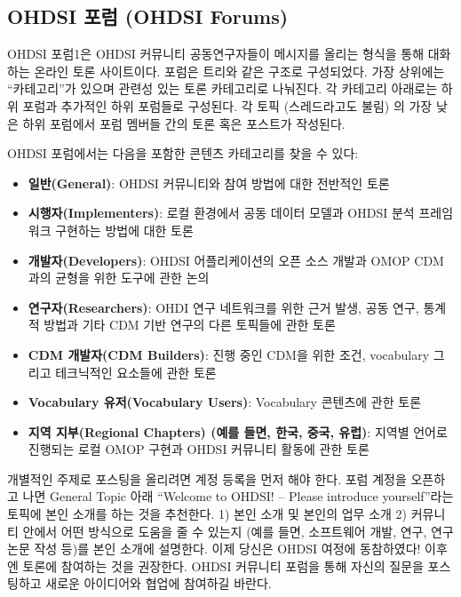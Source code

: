 \documentclass[11pt]{book}
\providecommand{\tightlist}{%
  \setlength{\itemsep}{0pt}\setlength{\parskip}{0pt}}
\theoremstyle{definition}
\theoremstyle{definition}
\theoremstyle{definition}
\theoremstyle{remark}
\begin{document}
\subsection{OHDSI 포럼 (OHDSI Forums)}\label{ohdsi--ohdsi-forums}

OHDSI 포럼1은 OHDSI 커뮤니티 공동연구자들이 메시지를 올리는 형식을 통해
대화하는 온라인 토론 사이트이다. 포럼은 트리와 같은 구조로 구성되었다.
가장 상위에는 ``카테고리''가 있으며 관련성 있는 토론 카테고리로
나눠진다. 각 카테고리 아래로는 하위 포럼과 추가적인 하위 포럼들로
구성된다. 각 토픽 (스레드라고도 불림) 의 가장 낮은 하위 포럼에서 포럼
멤버들 간의 토론 혹은 포스트가 작성된다.

OHDSI 포럼에서는 다음을 포함한 콘텐츠 카테고리를 찾을 수 있다:

\begin{itemize}
\tightlist
\item
  \textbf{일반(General)}: OHDSI 커뮤니티와 참여 방법에 대한 전반적인
  토론
\item
  \textbf{시행자(Implementers)}: 로컬 환경에서 공동 데이터 모델과 OHDSI
  분석 프레임워크 구현하는 방법에 대한 토론
\item
  \textbf{개발자(Developers)}: OHDSI 어플리케이션의 오픈 소스 개발과
  OMOP CDM과의 균형을 위한 도구에 관한 논의
\item
  \textbf{연구자(Researchers)}: OHDI 연구 네트워크를 위한 근거 발생,
  공동 연구, 통계적 방법과 기타 CDM 기반 연구의 다른 토픽들에 관한 토론
\item
  \textbf{CDM 개발자(CDM Builders)}: 진행 중인 CDM을 위한 조건,
  vocabulary 그리고 테크닉적인 요소들에 관한 토론
\item
  \textbf{Vocabulary 유저(Vocabulary Users)}: Vocabulary 콘텐츠에 관한
  토론
\item
  \textbf{지역 지부(Regional Chapters) (예를 들면, 한국, 중국, 유럽)}:
  지역별 언어로 진행되는 로컬 OMOP 구현과 OHDSI 커뮤니티 활동에 관한
  토론
\end{itemize}

개별적인 주제로 포스팅을 올리려면 계정 등록을 먼저 해야 한다. 포럼
계정을 오픈하고 나면 General Topic 아래 ``Welcome to OHDSI! -- Please
introduce yourself''라는 토픽에 본인 소개를 하는 것을 추천한다. 1) 본인
소개 및 본인의 업무 소개 2) 커뮤니티 안에서 어떤 방식으로 도움을 줄 수
있는지 (예를 들면, 소프트웨어 개발, 연구, 연구 논문 작성 등)를 본인
소개에 설명한다. 이제 당신은 OHDSI 여정에 동참하였다! 이후엔 토론에
참여하는 것을 권장한다. OHDSI 커뮤니티 포럼을 통해 자신의 질문을
포스팅하고 새로운 아이디어와 협업에 참여하길 바란다. 
\end{document}
